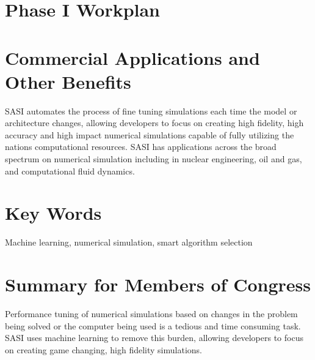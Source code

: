 \section*{Phase I Workplan}

\section*{Commercial Applications and Other Benefits}
SASI automates the process of fine tuning simulations each time the model or 
architecture changes, allowing developers to focus on creating high fidelity, high 
accuracy and high impact numerical simulations capable of fully utilizing the nations 
computational resources. SASI has applications across the broad spectrum on numerical simulation
including in nuclear engineering, oil and gas, and computational fluid dynamics. 

\section*{Key Words}
Machine learning, numerical simulation, smart algorithm selection

\section*{Summary for Members of Congress}
Performance tuning of numerical simulations based on changes in the problem being solved or the computer 
being used is a tedious and time consuming task. SASI uses machine learning to remove this burden, allowing 
developers to focus on creating game changing, high fidelity simulations. 

